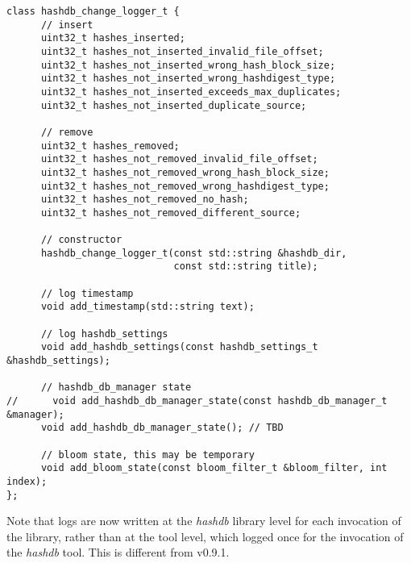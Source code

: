 \documentclass[12pt,twoside]{article}
\newcommand{\hdb}{\emph{hashdb}\xspace}
\begin{document}
\begin{small}
\begin{verbatim}
class hashdb_change_logger_t {
      // insert
      uint32_t hashes_inserted;
      uint32_t hashes_not_inserted_invalid_file_offset;
      uint32_t hashes_not_inserted_wrong_hash_block_size;
      uint32_t hashes_not_inserted_wrong_hashdigest_type;
      uint32_t hashes_not_inserted_exceeds_max_duplicates;
      uint32_t hashes_not_inserted_duplicate_source;

      // remove
      uint32_t hashes_removed;
      uint32_t hashes_not_removed_invalid_file_offset;
      uint32_t hashes_not_removed_wrong_hash_block_size;
      uint32_t hashes_not_removed_wrong_hashdigest_type;
      uint32_t hashes_not_removed_no_hash;
      uint32_t hashes_not_removed_different_source;

      // constructor
      hashdb_change_logger_t(const std::string &hashdb_dir,
                             const std::string title);

      // log timestamp
      void add_timestamp(std::string text);

      // log hashdb_settings
      void add_hashdb_settings(const hashdb_settings_t &hashdb_settings);

      // hashdb_db_manager state
//      void add_hashdb_db_manager_state(const hashdb_db_manager_t &manager);
      void add_hashdb_db_manager_state(); // TBD

      // bloom state, this may be temporary
      void add_bloom_state(const bloom_filter_t &bloom_filter, int index);
};
\end{verbatim}
\end{small}

Note that logs are now written at the \hdb library level
for each invocation of the library,
rather than at the tool level, which logged once
for the invocation of the \hdb tool.
This is different from v0.9.1.

\end{document}
